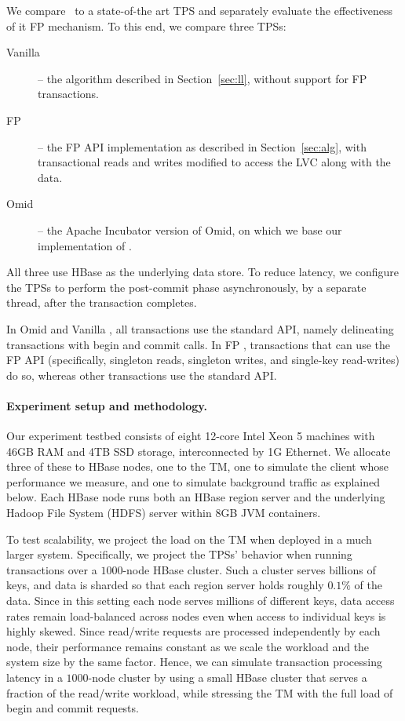 We compare \sys\  to a state-of-the art TPS and separately evaluate the effectiveness of it FP mechanism.
To this end, we compare three TPSs: 
\begin{description}
\item[Vanilla \sys] -- the algorithm described in Section~\ref{sec:ll}, without support for FP transactions.
\item[FP \sys] -- the FP API implementation as described in Section~\ref{sec:alg},
with transactional reads and writes  modified to access the LVC along with the data.
\item[Omid] -- the Apache Incubator version of Omid, on which we base
our implementation of \sys. 
\end{description}

All three use HBase as the underlying data store. To reduce latency,
we configure the TPSs to perform the post-commit phase asynchronously, 
by a separate thread, after the transaction completes.

In Omid and Vanilla \sys, all transactions use the standard API, namely 
delineating transactions with begin and commit calls.
In FP \sys, transactions that can use the FP API (specifically, singleton reads, singleton writes, 
and single-key read-writes) do so, whereas other transactions use the standard API.

\paragraph{Experiment setup and methodology.}

Our experiment testbed consists of eight 12-core Intel Xeon 5 machines with 46GB RAM and 4TB 
SSD storage, interconnected by 1G Ethernet. We allocate three of these to HBase nodes, 
one to the TM, one to simulate the client whose performance we measure, and one to simulate background traffic
as explained below. Each HBase node runs both an HBase region server and the underlying 
Hadoop File System (HDFS) server within 8GB JVM containers. 

To test scalability, we project the load on the TM when deployed in a much larger system. 
Specifically, we project the TPSs' behavior when running transactions over a $1000$-node HBase cluster.
Such a cluster serves billions of keys, and data is sharded so that each region server 
holds roughly $0.1\%$ of the data.
Since in this setting each node serves millions of different keys, 
data access rates remain load-balanced across nodes 
even when access to individual keys is highly skewed. 
Since read/write requests are processed independently by each node, 
their performance remains constant as we scale the workload and the 
system size by the same factor. 
Hence, we can simulate transaction processing latency in 
a $1000$-node cluster
by using a small HBase cluster that serves a fraction of the read/write workload, 
while stressing the TM with the full load of begin and commit requests. 

